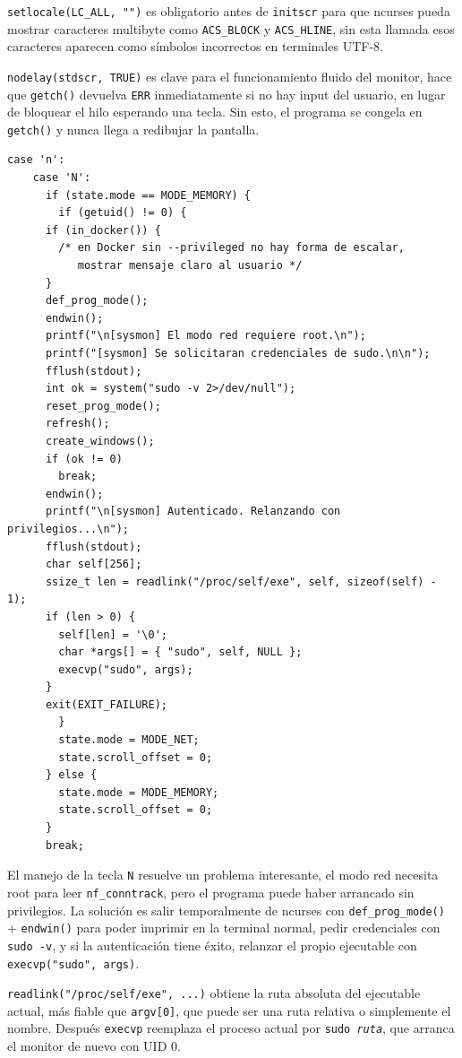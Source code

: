 \documentclass[12pt,letterpaper]{article}
\begin{document}
\texttt{setlocale(LC\_ALL, "")} es obligatorio antes de \texttt{initscr} para que ncurses pueda mostrar
caracteres multibyte como \texttt{ACS\_BLOCK} y \texttt{ACS\_HLINE}, sin esta llamada esos caracteres aparecen
como símbolos incorrectos en terminales UTF-8.

\medskip

\texttt{nodelay(stdscr, TRUE)} es clave para el funcionamiento fluido del monitor, hace que \texttt{getch()}
devuelva \texttt{ERR} inmediatamente si no hay input del usuario, en lugar de bloquear el hilo esperando una
tecla. Sin esto, el programa se congela en \texttt{getch()} y nunca llega a redibujar la pantalla.

\begin{lstlisting}[style=modernc, caption={\texttt{ui.c} ui\_run() manejo de N con sudo}]
    case 'n':
    case 'N':
      if (state.mode == MODE_MEMORY) {
        if (getuid() != 0) {
	  if (in_docker()) {
	    /* en Docker sin --privileged no hay forma de escalar,
	       mostrar mensaje claro al usuario */
	  }
	  def_prog_mode();
	  endwin();
	  printf("\n[sysmon] El modo red requiere root.\n");
	  printf("[sysmon] Se solicitaran credenciales de sudo.\n\n");
	  fflush(stdout);
	  int ok = system("sudo -v 2>/dev/null");
	  reset_prog_mode();
	  refresh();
	  create_windows();
	  if (ok != 0)
	    break;
	  endwin();
	  printf("\n[sysmon] Autenticado. Relanzando con privilegios...\n");
	  fflush(stdout);
	  char self[256];
	  ssize_t len = readlink("/proc/self/exe", self, sizeof(self) - 1);
	  if (len > 0) {
	    self[len] = '\0';
	    char *args[] = { "sudo", self, NULL };
	    execvp("sudo", args);
	  }
	  exit(EXIT_FAILURE);
        }
        state.mode = MODE_NET;
        state.scroll_offset = 0;
      } else {
        state.mode = MODE_MEMORY;
        state.scroll_offset = 0;
      }
      break;
\end{lstlisting}

El manejo de la tecla \texttt{N} resuelve un problema interesante, el modo red necesita root para leer
\texttt{nf\_conntrack}, pero el programa puede haber arrancado sin privilegios. La solución es salir
temporalmente de ncurses con \texttt{def\_prog\_mode()} + \texttt{endwin()} para poder imprimir en la terminal
normal, pedir credenciales con \texttt{sudo -v}, y si la autenticación tiene éxito, relanzar el propio
ejecutable con \texttt{execvp("sudo", args)}.

\medskip

\texttt{readlink("/proc/self/exe", ...)} obtiene la ruta absoluta del ejecutable actual, más fiable que
\texttt{argv[0]}, que puede ser una ruta relativa o simplemente el nombre. Después \texttt{execvp} reemplaza el
proceso actual por \texttt{sudo \textit{ruta}}, que arranca el monitor de nuevo con UID 0.
\end{document}
